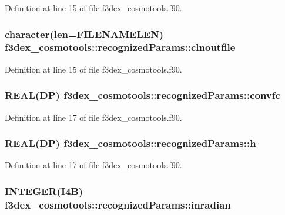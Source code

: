 Definition at line 15 of file f3dex\_\-cosmotools.f90.

\hypertarget{typef3dex__cosmotools_1_1recognized_params_a69c1862dd1d799d9b5bc9f425013ce77}{
\subsubsection[{clnoutfile}]{\setlength{\rightskip}{0pt plus 5cm}character(len=FILENAMELEN) {\bf f3dex\_\-cosmotools::recognizedParams::clnoutfile}}}
\label{typef3dex__cosmotools_1_1recognized_params_a69c1862dd1d799d9b5bc9f425013ce77}


Definition at line 15 of file f3dex\_\-cosmotools.f90.

\hypertarget{typef3dex__cosmotools_1_1recognized_params_aaf93c238ca73e73267becded53135fe8}{
\subsubsection[{convfc}]{\setlength{\rightskip}{0pt plus 5cm}REAL(DP) {\bf f3dex\_\-cosmotools::recognizedParams::convfc}}}
\label{typef3dex__cosmotools_1_1recognized_params_aaf93c238ca73e73267becded53135fe8}


Definition at line 17 of file f3dex\_\-cosmotools.f90.

\hypertarget{typef3dex__cosmotools_1_1recognized_params_a40d4fff5828ba45bb5239d2dec3edbb9}{
\subsubsection[{h}]{\setlength{\rightskip}{0pt plus 5cm}REAL(DP) {\bf f3dex\_\-cosmotools::recognizedParams::h}}}
\label{typef3dex__cosmotools_1_1recognized_params_a40d4fff5828ba45bb5239d2dec3edbb9}


Definition at line 17 of file f3dex\_\-cosmotools.f90.

\hypertarget{typef3dex__cosmotools_1_1recognized_params_a4d549e6d9fc5846730420a9c1afadad4}{
\subsubsection[{inradian}]{\setlength{\rightskip}{0pt plus 5cm}INTEGER(I4B) {\bf f3dex\_\-cosmotools::recognizedParams::inradian}}}
\label{typef3dex__cosmotools_1_1recognized_params_a4d549e6d9fc5846730420a9c1afadad4}


